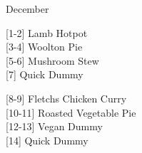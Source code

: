 		\begin{menu}{December}
    
    \begin{recipelist}
    
        {\scriptsize[1-2]} Lamb Hotpot\\
        {\scriptsize[3-4]} Woolton Pie\\
        {\scriptsize[5-6]} Mushroom Stew\\
        {\scriptsize[7]} Quick Dummy\\%
    \end{recipelist}%
    \begin{recipelist}
    
        {\scriptsize[8-9]} Fletchs Chicken Curry\\
        {\scriptsize[10-11]} Roasted Vegetable Pie\\
        {\scriptsize[12-13]} Vegan Dummy\\
        {\scriptsize[14]} Quick Dummy\\%
    \end{recipelist}\par%
  

\end{menu}

